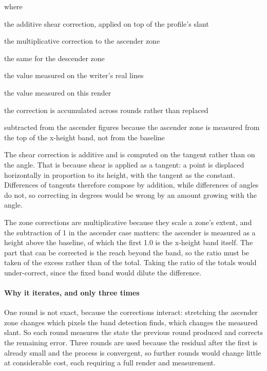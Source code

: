 \noindent where
\begin{description}[leftmargin=2.4em,style=nextline,font=\normalfont\ttfamily]\setlength\itemsep{1pt}
  \item[{$\Delta_{\mathrm{shear}}$}] \normalfont the additive shear correction, applied on top of the profile's slant
  \item[{$k_{\mathrm{asc}}$}] \normalfont the multiplicative correction to the ascender zone
  \item[{$k_{\mathrm{desc}}$}] \normalfont the same for the descender zone
  \item[{$\mathrm{ref}$}] \normalfont the value measured on the writer's real lines
  \item[{$\mathrm{got}$}] \normalfont the value measured on this render
  \item[{$\mathrel{+}=,\; \mathrel{\ast}=$}] \normalfont the correction is accumulated across rounds rather than replaced
  \item[{$-1$}] \normalfont subtracted from the ascender figures because the ascender zone is measured from the top of the x-height band, not from the baseline
\end{description}
The shear correction is additive and is computed on the tangent rather than on the angle. That is because shear is applied as a tangent: a point is displaced horizontally in proportion to its height, with the tangent as the constant. Differences of tangents therefore compose by addition, while differences of angles do not, so correcting in degrees would be wrong by an amount growing with the angle.

The zone corrections are multiplicative because they scale a zone's extent, and the subtraction of 1 in the ascender case matters: the ascender is measured as a height above the baseline, of which the first 1.0 is the x-height band itself. The part that can be corrected is the reach beyond the band, so the ratio must be taken of the excess rather than of the total. Taking the ratio of the totals would under-correct, since the fixed band would dilute the difference.


\paragraph{Why it iterates, and only three times}
One round is not exact, because the corrections interact: stretching the ascender zone changes which pixels the band detection finds, which changes the measured slant. So each round measures the state the previous round produced and corrects the remaining error. Three rounds are used because the residual after the first is already small and the process is convergent, so further rounds would change little at considerable cost, each requiring a full render and measurement.


